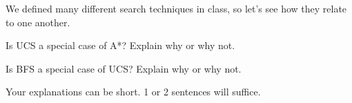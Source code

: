 \item {}
We defined many different search techniques in class, so let's see how they
relate to one another.

Is UCS a special case of A*? Explain why or why not.

Is BFS a special case of UCS? Explain why or why not.

Your explanations can be short. 1 or 2 sentences will suffice.
